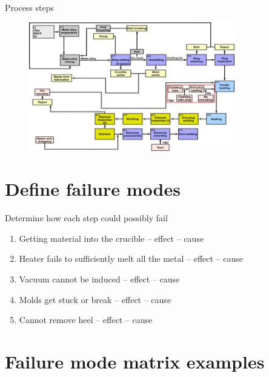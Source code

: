 \documentclass[aspectratio=1610,pdftex,dvipsnames,compress,xcolor={dvipsnames}]{beamer}
\begin{document}
\begin{frame}{Process steps}
    \begin{figure}
        \centering
        \includegraphics[width=0.80\textwidth]{fuel.fabrication.process.steps.jpg}
    \end{figure}
\end{frame}


\section{Define failure modes}


\addtocounter{framenumber}{-1}
\begin{frame}{Determine how each step could possibly fail}
    \begin{enumerate}[series=outerlist,topsep=0pt,itemsep=21pt,leftmargin=*,label=(\arabic*)]
        \item[]Getting material into the crucible -- effect -- cause
        \item[]Heater fails to sufficiently melt all the metal -- effect -- cause
        \item[]Vacuum cannot be induced -- effect -- cause
        \item[]Molds get stuck or break -- effect -- cause
        \item[]Cannot remove heel -- effect -- cause
    \end{enumerate}
\end{frame}


\section{Failure mode matrix examples}
\end{document}
